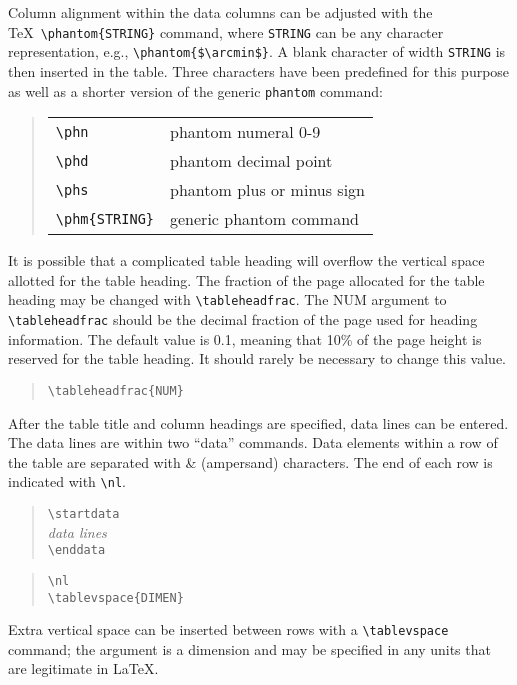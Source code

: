 Column alignment within the data columns can be adjusted with the \TeX\
\verb"\phantom{STRING}" command, where {\tt STRING} can be any character
representation, e.g., \verb"\phantom{$\arcmin$}".  A blank character of
width {\tt STRING} is then inserted in the table.  Three
characters have been predefined for this purpose as well as a shorter version
of the generic \verb"phantom" command:
\begin{quote}
\begin{tabular}{l@{\quad}p{2in}}
{\verb"\phn"} & {phantom numeral 0-9}\\
{\verb"\phd"} & {phantom decimal point}\\
{\verb"\phs"} & {phantom plus or minus sign}\\
{\verb"\phm{STRING}"} & {generic phantom command}\\
\end{tabular}
\end{quote}

It is possible that a complicated table heading will overflow
the vertical space allotted for the table heading.
The fraction of the page allocated
for the table heading may be changed with \verb"\tableheadfrac".
The {\small NUM} argument to \verb"\tableheadfrac" should be the
decimal fraction of the page used for heading information.
The default value is 0.1, meaning that 10\% of the page height
is reserved for the table heading.  It should rarely be necessary
to change this value.
\begin{quote}
\verb"\tableheadfrac{NUM}"
\end{quote}

After the table title and column headings are specified, data lines
can be entered.  The data lines are within two ``data'' 
commands.
Data elements within a row of the table are separated with \& (ampersand)
characters.  The end of each row is indicated with \verb"\nl".
\begin{quote}
\verb"\startdata"\\
{\it data lines\/}\\
\verb"\enddata"
\end{quote}

\begin{quote}
\verb"\nl"\\
\verb"\tablevspace{DIMEN}"
\end{quote}

Extra vertical space can be inserted between rows with a
\verb"\tablevspace" command; the argument is a dimension
and may be specified in any units that are legitimate in \LaTeX.


